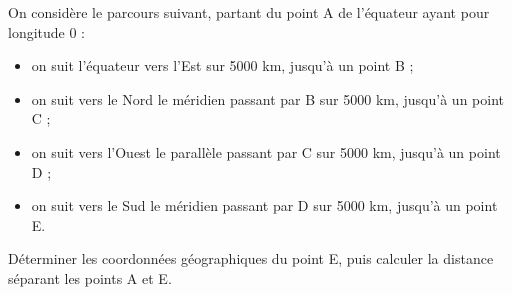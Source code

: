 
On considère le parcours suivant, partant du point A de l’équateur ayant pour longitude 0 :
\begin{itemize}
\item on suit l’équateur vers l’Est sur 5000 km, jusqu’à un point B ;
\item on suit vers le Nord le méridien passant par B sur 5000 km, jusqu’à un point C ;
\item on suit vers l’Ouest le parallèle passant par C sur 5000 km, jusqu’à un point D ;
\item on suit vers le Sud le méridien passant par D sur 5000 km, jusqu’à un point E.
\end{itemize}

Déterminer les coordonnées géographiques du point E, puis calculer la distance séparant les points A et E.

